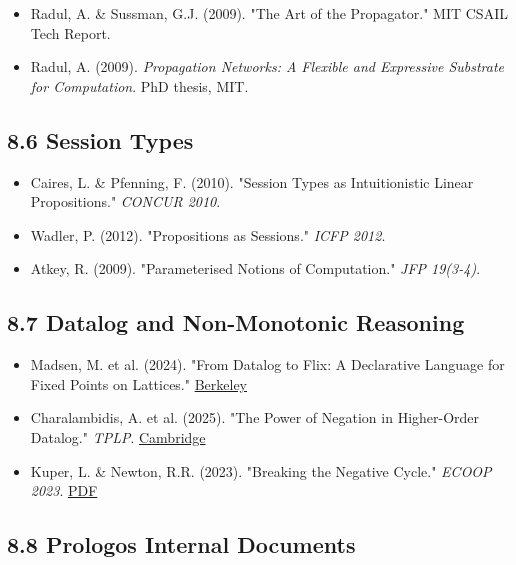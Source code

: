 \documentclass[11pt]{article}
\begin{document}
\begin{itemize}
\item Radul, A. \& Sussman, G.J. (2009). "The Art of the Propagator." MIT CSAIL
Tech Report.
\item Radul, A. (2009). \emph{Propagation Networks: A Flexible and Expressive Substrate
for Computation}. PhD thesis, MIT.
\end{itemize}
\subsection{8.6 Session Types}
\label{sec:orga3fdac7}

\begin{itemize}
\item Caires, L. \& Pfenning, F. (2010). "Session Types as Intuitionistic Linear
Propositions." \emph{CONCUR 2010}.
\item Wadler, P. (2012). "Propositions as Sessions." \emph{ICFP 2012}.
\item Atkey, R. (2009). "Parameterised Notions of Computation." \emph{JFP 19(3-4)}.
\end{itemize}
\subsection{8.7 Datalog and Non-Monotonic Reasoning}
\label{sec:org5b3509b}

\begin{itemize}
\item Madsen, M. et al. (2024). "From Datalog to Flix: A Declarative Language for
Fixed Points on Lattices."
\href{https://inst.eecs.berkeley.edu/\~cs294-260/sp24/2024-02-12-flix}{Berkeley}
\item Charalambidis, A. et al. (2025). "The Power of Negation in Higher-Order
Datalog." \emph{TPLP}.
\href{https://www.cambridge.org/core/journals/theory-and-practice-of-logic-programming/article/power-of-negation-in-higherorder-datalog/F29B686E15B1D940647C9C500E335194}{Cambridge}
\item Kuper, L. \& Newton, R.R. (2023). "Breaking the Negative Cycle." \emph{ECOOP 2023}.
\href{https://drops.dagstuhl.de/storage/00lipics/lipics-vol263-ecoop2023/LIPIcs.ECOOP.2023.31/LIPIcs.ECOOP.2023.31.pdf}{PDF}
\end{itemize}
\subsection{8.8 Prologos Internal Documents}
\label{sec:org43d3c2a}
\end{document}
